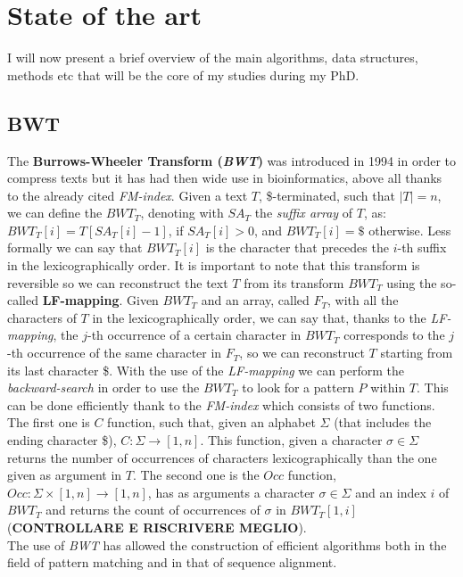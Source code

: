\documentclass[a4paper,11pt, oneside]{article}
\begin{document}
\section*{State of the art}
I will now present a brief overview of the main algorithms, data structures,
methods etc that will be the core of my studies during my PhD. 
\subsection*{BWT}
The \textbf{Burrows-Wheeler Transform (\textit{BWT})}
was introduced
in 1994 in order to compress texts but it has had then wide use in
bioinformatics, above all thanks to the already cited \textit{FM-index}. Given a
text $T$, \$-terminated, such that $|T|=n$, we can define the $BWT_T$, denoting
with $SA_T$ the \textit{suffix array} of $T$, as:
$BWT_T[i] = T[SA_T[i]-1]$, if $SA_T[i]>0$, and $BWT_T[i] = \$ $ otherwise. Less
formally we can say that $BWT_T[i]$ is the character that precedes the $i$-th
suffix in the lexicographically order. It is important to note that this
transform is reversible so we can reconstruct the text $T$ from its transform
$BWT_T$ using the so-called \textbf{LF-mapping}. Given $BWT_T$ and an array,
called $F_T$, with all the characters of $T$ in the lexicographically order, we
can say that, thanks to the \textit{LF-mapping}, the $j$-th occurrence of a
certain character in $BWT_T$ corresponds to the $j$-th occurrence of the same
character in $F_T$, so we can reconstruct $T$ starting from its last character
\$. With the use of the \textit{LF-mapping} we can perform the
\textit{backward-search} in order to use the $BWT_T$ to look for a pattern $P$
within $T$. This can be done efficiently thank to the \textit{FM-index} which
consists of two functions. The first one is $C$ function, such that, given an
alphabet $\Sigma$ (that includes the ending character \$),
$C:\Sigma\to[1,n]$. This function, given a character $\sigma\in \Sigma$ returns
the number of occurrences of characters lexicographically than the one given as
argument in $T$. The second one is the $Occ$ function,
$Occ:\Sigma\times[1,n]\to[1,n]$, has as arguments a character $\sigma\in\Sigma$
and an index $i$ of $BWT_T$ and returns the count of occurrences of $\sigma$ in
$BWT_T[1,i]$ (\textbf{CONTROLLARE E RISCRIVERE MEGLIO}).\\
The use of \textit{BWT} has allowed the construction of efficient algorithms
both in the field of pattern matching and in that of sequence alignment. 
\end{document}
